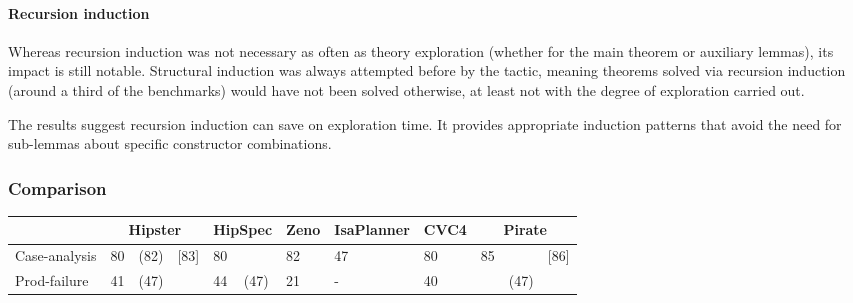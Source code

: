 \paragraph{Recursion induction}

Whereas recursion induction was not necessary as often as theory exploration (whether for the main theorem or auxiliary lemmas), its impact is still notable.
%
Structural induction was always attempted before by the tactic, meaning theorems solved via recursion induction (around a third of the benchmarks) would have not been solved otherwise, at least not with the degree of exploration carried out.
 
The results suggest recursion induction can save on exploration time.
%
It provides appropriate induction patterns that avoid the need for sub-lemmas about specific constructor combinations.


\subsubsection{Comparison}


\begin{tabularx}{\textwidth}{l | X X X | X X | X | X | X | X X X}
  & \multicolumn{3}{|c|}{Hipster}
  	& \multicolumn{2}{c|}{HipSpec}
  	& \multicolumn{1}{c|}{Zeno}
  	& \multicolumn{1}{c|}{IsaPlanner}
  	& \multicolumn{1}{c|}{CVC4}
  	& \multicolumn{3}{c}{Pirate} \\
  \hline
  Case-analysis & 80 & (82) & [83] & 80 & & 82 & 47 & 80 & 85 & & [86] \\
  Prod-failure & 41 & (47) & & 44 & (47) & 21 & - & 40 & & (47) & \\
\end{tabularx}





